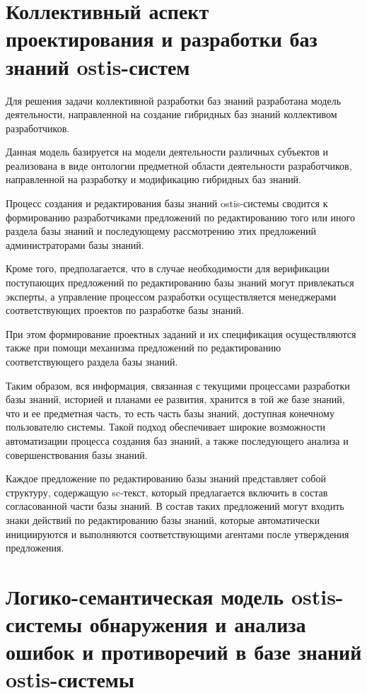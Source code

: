 \section{Коллективный аспект проектирования и разработки баз знаний ostis-систем}
\label{sec_kb_design_collective}

Для решения задачи коллективной разработки баз знаний разработана модель деятельности, направленной на создание гибридных баз знаний коллективом разработчиков.

Данная модель базируется на модели деятельности различных субъектов и реализована в виде онтологии предметной области деятельности разработчиков, направленной на разработку и модификацию гибридных баз знаний.

Процесс создания и редактирования базы знаний ostis-системы сводится к формированию разработчиками предложений по редактированию того или иного раздела базы знаний и последующему рассмотрению этих предложений администраторами базы знаний.

Кроме того, предполагается, что в случае необходимости для верификации поступающих предложений по редактированию базы знаний могут привлекаться эксперты, а управление процессом разработки осуществляется менеджерами соответствующих проектов по разработке базы знаний.

При этом формирование проектных заданий и их спецификация осуществляются также при помощи механизма предложений по редактированию соответствующего раздела базы знаний. 

Таким образом, вся информация, связанная с текущими процессами разработки базы знаний, историей и планами ее развития, хранится в той же базе знаний, что и ее предметная часть, то есть часть базы знаний, доступная конечному пользователю системы. Такой подход обеспечивает широкие возможности автоматизации процесса создания баз знаний, а также последующего анализа и совершенствования базы знаний.

Каждое предложение по редактированию базы знаний представляет собой структуру, содержащую sc-текст, который предлагается включить в состав согласованной части базы знаний. В состав таких предложений могут входить знаки действий по редактированию базы знаний, которые автоматически инициируются и выполняются соответствующими агентами после утверждения предложения.


\section{Логико-семантическая модель ostis-системы обнаружения и анализа ошибок и противоречий в базе знаний ostis-системы}
\label{sec_kb_design_contradiction}

